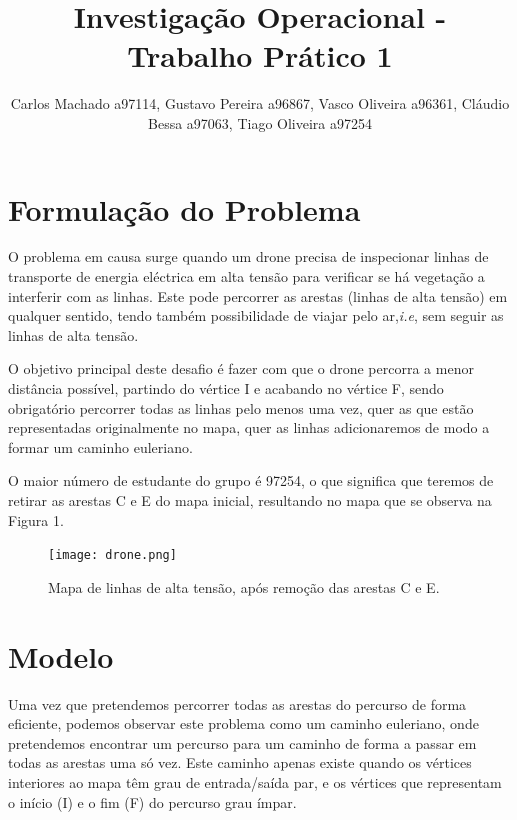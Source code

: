\documentclass[runningheads]{llncs}
\begin{document}
%
\title{Investigação Operacional - Trabalho Prático 1}
\author{Carlos Machado a97114, Gustavo Pereira a96867,
Vasco Oliveira a96361, Cláudio Bessa a97063, Tiago Oliveira a97254}





\maketitle      
\newpage
\section{Formulação do Problema}


O problema em causa surge quando um drone precisa de inspecionar linhas de transporte de energia eléctrica em alta tensão para verificar se há vegetação a interferir com as linhas. Este pode percorrer as arestas (linhas de alta tensão) em qualquer sentido, tendo também possibilidade de viajar pelo ar,\textit{i.e}, sem seguir as linhas de alta tensão.

O objetivo principal deste desafio é fazer com que o drone percorra a menor distância possível, partindo do vértice I e acabando no vértice F, sendo obrigatório percorrer todas as linhas pelo menos uma vez, quer as que estão representadas originalmente no mapa, quer as linhas adicionaremos de modo a formar um caminho euleriano.

O maior número de estudante do grupo é 97254, o que significa que teremos de retirar as arestas C e E do mapa inicial, resultando no mapa que se observa na Figura 1.

\begin{figure}[h]
\centering
\texttt{[image: drone.png]}
\caption{Mapa de linhas de alta tensão, após remoção das arestas C e E.} 
\label{fig:data1}
\end{figure}

\newpage 

\section{Modelo}
Uma vez que pretendemos percorrer todas as arestas do percurso de forma eficiente, podemos observar este problema como um caminho euleriano, onde pretendemos encontrar um percurso para um caminho de forma a passar em todas as arestas uma só vez. Este caminho apenas existe quando os vértices interiores ao mapa têm grau de entrada/saída par, e os vértices que representam o início (I) e o fim (F) do percurso grau ímpar.
\end{document}
